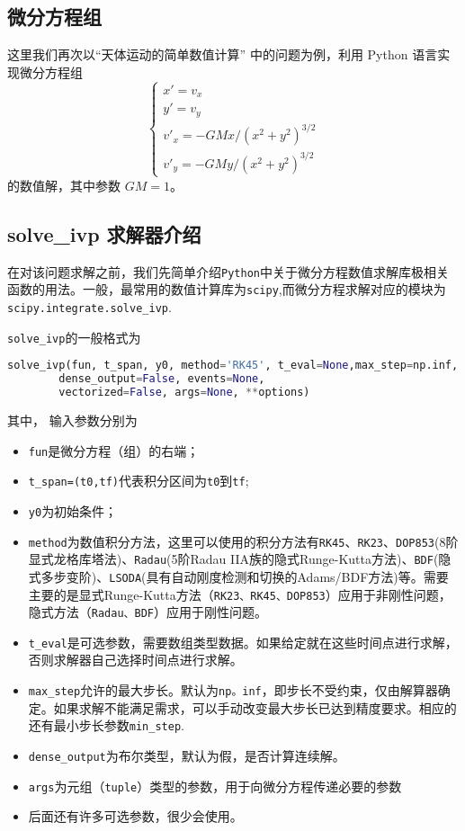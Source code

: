 \subsection{微分方程组}
这里我们再次以“天体运动的简单数值计算” 中的问题为例，利用 Python 语言实现微分方程组
\begin{equation}\label{PyIVP_eq}
\begin{cases}
x' = v_x\\
y' = v_y\\
v'_x = -GMx/(x^2 + y^2)^{3/2}\\
v'_y = -GMy/(x^2 + y^2)^{3/2}
\end{cases}
\end{equation}
的数值解，其中参数 $GM=1$。
\subsection{solve\_ivp 求解器介绍}
在对该问题求解之前，我们先简单介绍\verb|Python|中关于微分方程数值求解库极相关函数的用法。一般，最常用的数值计算库为\verb|scipy|,而微分方程求解对应的模块为\verb|scipy.integrate.solve_ivp|.

 \verb|solve_ivp|的一般格式为
 \begin{lstlisting}[language=python]
 solve_ivp(fun, t_span, y0, method='RK45', t_eval=None,max_step=np.inf,
        dense_output=False, events=None, 
        vectorized=False, args=None, **options)
 \end{lstlisting}
 其中， 输入参数分别为
\begin{itemize}
\item \verb|fun|是微分方程（组）的右端；
\item  \verb|t_span=(t0,tf)|代表积分区间为\verb|t0|到\verb|tf|;
\item  \verb|y0|为初始条件；
\item \verb|method|为数值积分方法，这里可以使用的积分方法有\verb|RK45|、\verb|RK23|、\verb|DOP853|(8阶显式龙格库塔法)、\verb|Radau|(5阶Radau IIA族的隐式Runge-Kutta方法)、\verb|BDF|(隐式多步变阶)、\verb|LSODA|(具有自动刚度检测和切换的Adams/BDF方法)等。需要主要的是显式Runge-Kutta方法（\verb|RK23、RK45、DOP853|）应用于非刚性问题，隐式方法（\verb|Radau、BDF|）应用于刚性问题。
\item \verb|t_eval|是可选参数，需要数组类型数据。如果给定就在这些时间点进行求解，否则求解器自己选择时间点进行求解。
\item \verb|max_step|允许的最大步长。默认为\verb|np。inf|，即步长不受约束，仅由解算器确定。如果求解不能满足需求，可以手动改变最大步长已达到精度要求。相应的还有最小步长参数\verb|min_step|.
\item \verb|dense_output|为布尔类型，默认为假，是否计算连续解。
\item \verb|args|为元组（\verb|tuple|）类型的参数，用于向微分方程传递必要的参数
\item 后面还有许多可选参数，很少会使用。
\end{itemize}

